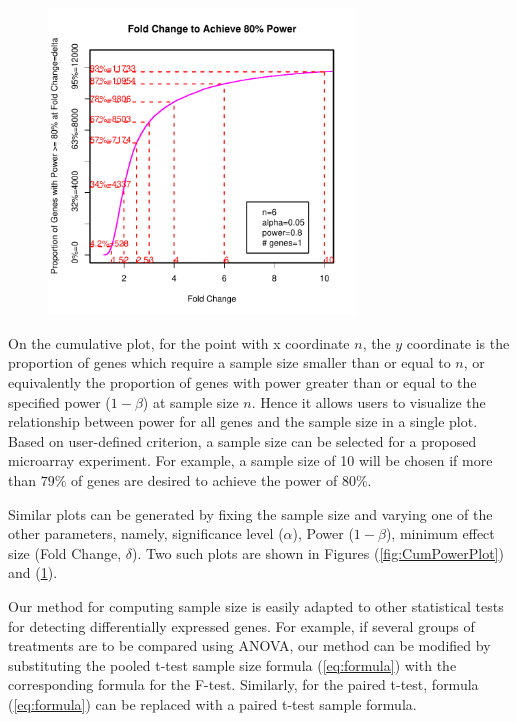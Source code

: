 \documentclass{bioinfo}
\begin{document}
\begin{figure}[h]
  \centerline{\includegraphics*[width=3.2in]{CumFoldChangePlot.pdf}}
  \caption[Given Sample Size, Fold Change (Effect Size) Necessary to
    Achieving a Specified Power]{}
  \label{fig:CumFoldChangePlot}
\end{figure}

On the cumulative plot, for the point with x coordinate $n$, the $y$
coordinate is the proportion of genes which require a sample size
smaller than or equal to $n$, or equivalently the
proportion of genes with power greater than or equal to the
specified power ($1-\beta$) at sample size $n$. Hence it allows
users to visualize the relationship between power for all genes and
the sample size in a single plot. Based on user-defined criterion, a
sample size can be selected for a proposed microarray experiment.
For example, a sample size of 10 will be chosen if more than $79\%$
of genes are desired to achieve the power of $80\%$.

Similar plots can be generated by fixing the sample size and varying
one of the other parameters, namely, significance level ($\alpha$),
Power ($1-\beta$), minimum effect size (Fold Change, $\delta$). Two
such plots are shown in Figures (\ref{fig:CumPowerPlot}) and
(\ref{fig:CumFoldChangePlot}).

Our method for computing sample size is easily adapted to other
statistical tests for detecting differentially expressed genes. For
example, if several groups of treatments are to be compared using
ANOVA, our method can be modified by substituting the pooled t-test
sample size formula (\ref{eq:formula}) with the corresponding
formula for the F-test. Similarly, for the paired t-test, formula
(\ref{eq:formula}) can be replaced with a paired t-test sample
formula.
\end{document}
